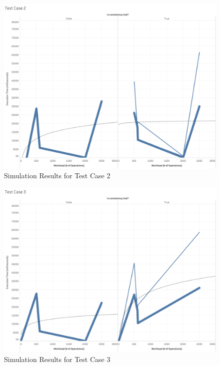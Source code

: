 \begin{figure}
\centering
\includegraphics[scale=0.23]{images/TestCase2(WL).png}
\caption{Simulation Results for Test Case 2}
\label{results:test_case_graphs_2}
\end{figure}

\begin{figure}
\centering
\includegraphics[scale=0.23]{images/TestCase3(WL).png}
\caption{Simulation Results for Test Case 3}
\label{results:test_case_graphs_3}
\end{figure}

